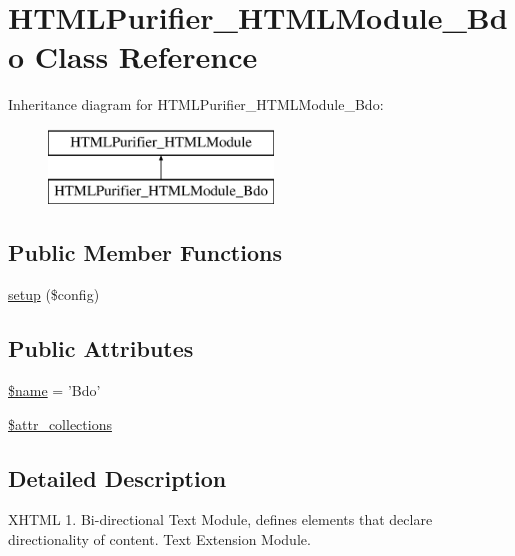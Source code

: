 \hypertarget{classHTMLPurifier__HTMLModule__Bdo}{\section{H\+T\+M\+L\+Purifier\+\_\+\+H\+T\+M\+L\+Module\+\_\+\+Bdo Class Reference}
\label{classHTMLPurifier__HTMLModule__Bdo}
}
Inheritance diagram for H\+T\+M\+L\+Purifier\+\_\+\+H\+T\+M\+L\+Module\+\_\+\+Bdo\+:\begin{figure}[H]
\begin{center}
\leavevmode
\includegraphics[height=2.000000cm]{classHTMLPurifier__HTMLModule__Bdo}
\end{center}
\end{figure}
\subsection*{Public Member Functions}
\begin{DoxyCompactItemize}
\item 
\hyperlink{classHTMLPurifier__HTMLModule__Bdo_a9983e4dede92c02dc19804f14a6d612c}{setup} (\$config)
\end{DoxyCompactItemize}
\subsection*{Public Attributes}
\begin{DoxyCompactItemize}
\item 
\hyperlink{classHTMLPurifier__HTMLModule__Bdo_ae63a3f1dac1f77d32b44946493fb4813}{\$name} = 'Bdo'
\item 
\hyperlink{classHTMLPurifier__HTMLModule__Bdo_a86c91c35877cd53221d7f0fb27267ad9}{\$attr\+\_\+collections}
\end{DoxyCompactItemize}


\subsection{Detailed Description}
X\+H\+T\+M\+L 1. Bi-\/directional Text Module, defines elements that declare directionality of content. Text Extension Module. 

